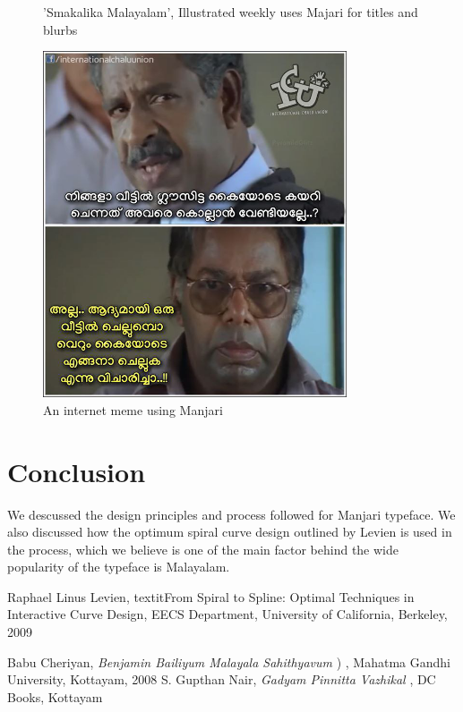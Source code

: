 \documentclass[11pt,twoside,a4paper,parskip=full]{scrartcl}
\begin{document}
\begin{figure}[h!]
\begin{subfigure}[b]{.45\textwidth}
	\end{subfigure}

	\caption{'Smakalika Malayalam', Illustrated weekly uses Majari for titles and blurbs}
	\label{manjari-sample-3}
\end{figure}



\begin{figure}[h!]
	\includegraphics[width=0.8\textwidth]{images/manjari-sample-4.png}
	\caption{An internet meme using Manjari}
	\label{manjari-sample-4}
\end{figure}




\clearpage
\section{Conclusion}

We descussed the design principles and process followed for Manjari typeface. We also discussed how the optimum spiral curve design outlined by Levien is used in the process, which we believe is one of the main factor behind the wide popularity of the typeface is Malayalam.


\begin{thebibliography}{11}

  Raphael Linus Levien,
  textit{From Spiral to Spline: Optimal Techniques in Interactive Curve Design},
  EECS Department, University of California, Berkeley,
  2009

 Babu Cheriyan, \textit{Benjamin Bailiyum Malayala Sahithyavum} {) }, Mahatma Gandhi University, Kottayam, 2008
	 S. Gupthan Nair, \textit{Gadyam Pinnitta Vazhikal}{ }, DC Books, Kottayam 

	
\end{thebibliography}
\end{document}
